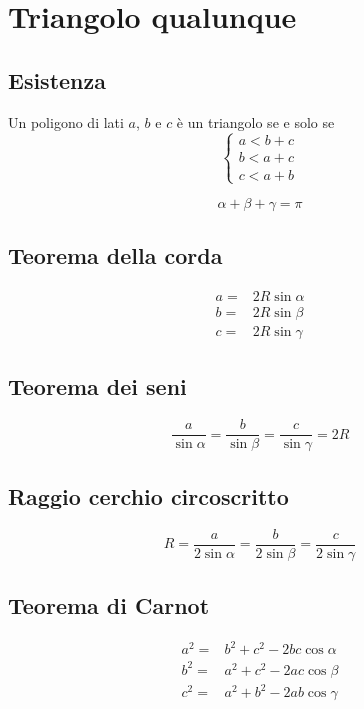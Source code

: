 \section{Triangolo qualunque}
\subsection{Esistenza}
Un poligono di lati $a$, $b$ e $c$ è un triangolo se e solo se
\[
\begin{cases}
a<b+c\\
b<a+c\\
c<a+b
\end{cases}
\]
\begin{center}
	
\end{center}
\begin{equation*}
\alpha+\beta+\gamma=\pi
\end{equation*}
\subsection{Teorema della corda}
\begin{align*}
a=&2R\sin\alpha\\
b=&2R\sin\beta\\
c=&2R\sin\gamma
\end{align*}
\subsection{Teorema dei seni}
\begin{equation*}
\dfrac{a}{\sin\alpha}=\dfrac{b}{\sin\beta}=\dfrac{c}{\sin\gamma}=2R
\end{equation*}
\subsection{Raggio cerchio circoscritto}
\begin{equation*}
R=\dfrac{a}{2\sin\alpha}=\dfrac{b}{2\sin\beta}=\dfrac{c}{2\sin\gamma}
\end{equation*}
\subsection{Teorema di Carnot}
\begin{align*}
a^2=&b^2+c^2-2bc\cos\alpha\\
b^2=&a^2+c^2-2ac\cos\beta\\
c^2=&a^2+b^2-2ab\cos\gamma
\end{align*}
